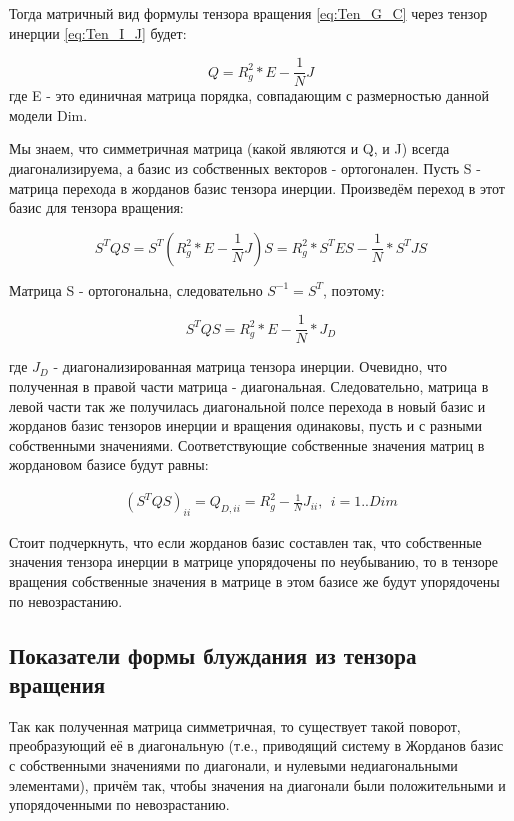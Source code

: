 Тогда матричный вид формулы тензора вращения \eqref{eq:Ten_G_C} через тензор инерции \eqref{eq:Ten_I_J} будет:

\begin{equation}
    Q = R_{g}^{2} * E - \frac{1}{N} J
\end{equation}
где E - это единичная матрица порядка, совпадающим с размерностью данной модели Dim.

Мы знаем, что симметричная матрица (какой являются и Q, и J) всегда диагонализируема, а базис из собственных векторов - ортогонален. Пусть S - матрица перехода в жорданов базис тензора инерции. Произведём переход в этот базис для тензора вращения:

\begin{equation*}
    S^{T}QS = S^{T} (R_{g}^{2} * E - \frac{1}{N} J) S = R^{2}_{g} * S^{T}ES-\frac{1}{N} * S^{T}JS
\end{equation*}

Матрица S - ортогональна, следовательно $S^{-1} = S^{T}$, поэтому:

\begin{equation}
    S^{T}QS = R^{2}_{g} * E - \frac{1}{N} * J_{D}
\end{equation}

где $J_{D}$ - диагонализированная матрица тензора инерции. Очевидно, что полученная в правой части матрица - диагональная. Следовательно, матрица в левой части так же получилась диагональной полсе перехода в новый базис и жорданов базис тензоров инерции и вращения одинаковы, пусть и с разными собственными значениями. Соответствующие собственные значения матриц в жордановом базисе будут равны:

\begin{align*}
    (S^{T}QS)_{ii} = Q_{D, ii} = R^{2}_{g} - \frac{1}{N}J_{ii},\ \ i=1..Dim
\end{align*}

Стоит подчеркнуть, что если жорданов базис составлен так, что собственные значения тензора инерции в матрице упорядочены по неубыванию, то в тензоре вращения собственные значения в матрице в этом базисе же будут упорядочены по невозрастанию.

\subsection{Показатели формы блуждания из тензора вращения}

Так как полученная матрица симметричная, то существует такой поворот, преобразующий её в диагональную (т.е., приводящий систему в Жорданов базис с собственными значениями по диагонали, и нулевыми недиагональными элементами), причём так, чтобы значения на диагонали были положительными и упорядоченными по невозрастанию.

